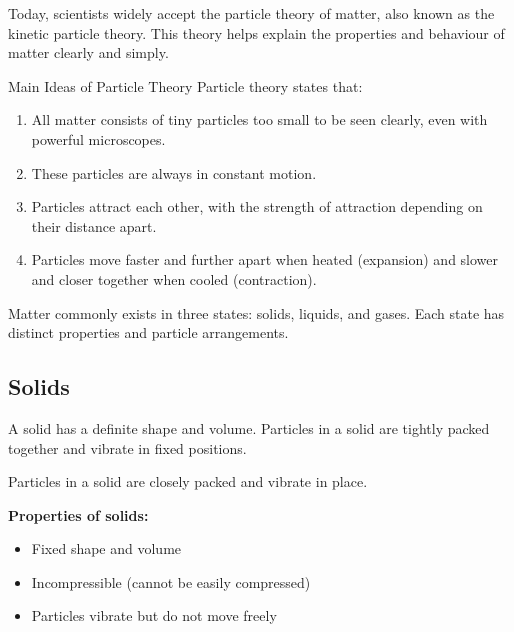 \FloatBarrier

Today, scientists widely accept the particle theory of matter, also known as the kinetic particle theory. This theory helps explain the properties and behaviour of matter clearly and simply.

\begin{keyconcept}{Main Ideas of Particle Theory}
Particle theory states that:
\begin{enumerate}
    \item All matter consists of tiny particles too small to be seen clearly, even with powerful microscopes.
    \item These particles are always in constant motion.
    \item Particles attract each other, with the strength of attraction depending on their distance apart.
    \item Particles move faster and further apart when heated (expansion) and slower and closer together when cooled (contraction).
\end{enumerate}
\end{keyconcept}

\FloatBarrier

Matter commonly exists in three states: solids, liquids, and gases. Each state has distinct properties and particle arrangements.

\subsection{Solids}

A solid has a definite shape and volume. Particles in a solid are tightly packed together and vibrate in fixed positions.

\begin{marginfigure}
\caption{Particles in a solid are closely packed and vibrate in place.}
\end{marginfigure}

\textbf{Properties of solids:}
\begin{itemize}
    \item Fixed shape and volume
    \item Incompressible (cannot be easily compressed)
    \item Particles vibrate but do not move freely
\end{itemize}

